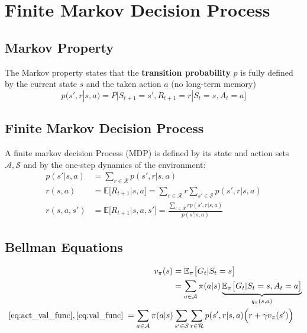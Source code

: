 \section{Finite Markov Decision Process}
\subsection{Markov Property}
The Markov property states that the \textbf{transition probability} $p$ is fully defined by the current state $s$ and the taken action $a$ (no long-term memory)
\noindent\begin{equation*}
    p(s',r|s,a)=P\bigl[S_{t+1}=s', R_{t+1}=r|S_t = s, A_t = a\bigr]
\end{equation*}
\subsection{Finite Markov Decision Process}
A finite markov decision Process (MDP) is defined by its state and action sets $\mathcal{A}, \mathcal{S}$ and by the one-step dynamics of the environment:
\noindent\begin{align*}
    p(s'|s,a) & = \sum_{r\in \mathcal{R}}p(s',r|s,a)                                                                   \\
    r(s,a)    & = \mathbb{E}\bigl[R_{t+1}|s,a \bigr] = \sum_{r\in \mathcal{R}} r \sum_{s'\in  \mathcal{S}} p(s',r|s,a) \\
    r(s,a,s') & = \mathbb{E}\bigl[R_{t+1}|s,a,s' \bigr] = \frac{\sum_{r\in \mathcal{R}} r p(s',r|s,a)}{p(s'|s,a)}
\end{align*}

\subsection{Bellman Equations}

\noindent\begin{align}
    \begin{split}\label{eq:val_func}
        v_\pi(s) & = \mathbb{E}_\pi\bigl[G_t|S_t = s\bigr]                                                                    \\
                 & = \sum_{a\in \mathcal{A}} \pi(a|s)\underbrace{\mathbb{E}_\pi\bigl[G_t|S_t = s, A_t = a\bigr]}_{q_\pi(s,a)}
    \end{split} \\
    \begin{split}\nonumber
        ~\eqref{eq:act_val_func},\eqref{eq:val_func} \; & =\sum_{a\in \mathcal{A}} \pi(a|s)\sum_{s'\in \mathcal{S}}\sum_{r\in \mathcal{R}} p(s',r|s,a)\Bigl(r + \gamma v_\pi(s') \Bigr)
    \end{split}
\end{align}


